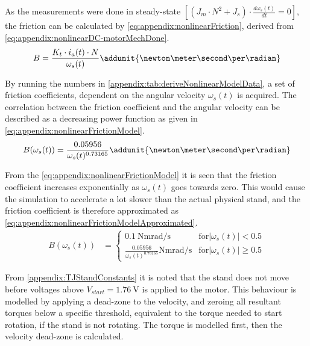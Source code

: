 As the measurements were done in steady-state $\left[ \left( J_m\cdot N^2 + J_s\right)\cdot \frac{d \omega_s(t)}{d t} = 0 \right]$, the friction can be calculated by \autoref{eq:appendix:nonlinearFriction}, derived from \autoref{eq:appendix:nonlinearDC-motorMechDone}.
\begin{equation}
B =\frac{K_t\cdot i_a(t)\cdot N}{\omega_s (t)} \addunit{\newton\meter\second\per\radian}\label{eq:appendix:nonlinearFriction}
\end{equation}

By running the numbers in \autoref{appendix:tab:deriveNonlinearModelData}, a set of friction coefficients, dependent on the angular velocity $\omega_s(t)$ is acquired. The correlation between the friction coefficient and the angular velocity can be described as a decreasing power function as given in \autoref{eq:appendix:nonlinearFrictionModel}.
\begin{equation}
B(\omega_s(t))=\frac{0.05956}{\omega_s(t)^{0.73165}} \addunit{\newton\meter\second\per\radian} \label{eq:appendix:nonlinearFrictionModel}
\end{equation}
\startexplain
{}
\stopexplain

From the \autoref{eq:appendix:nonlinearFrictionModel} it is seen that the friction coefficient increases exponentially as $\omega_s(t)$ goes towards zero. This would cause the simulation to accelerate a lot slower than the actual physical stand, and the friction coefficient is therefore approximated as \autoref{eq:appendix:nonlinearFrictionModelApproximated}.
\begin{align} \label{eq:appendix:nonlinearFrictionModelApproximated}
 B(\omega_s(t)) &=
  \begin{cases}
	\SI{0.1}{\newton\meter\radian\per\second}   															& \text{for} \left|\omega_s(t)\right| < 0.5 \\
	\frac{0.05956}{\omega_s(t)^{0.73165}} \si{\newton\meter\radian\per\second}		& \text{for} \left|\omega_s(t)\right| \geq 0.5
  \end{cases}
\end{align}

From \autoref{appendix:TJStandConstants} it is noted that the stand does not move before voltages above $V_{start} = \SI{1.76}{\volt}$ is applied to the motor. This behaviour is modelled by applying a dead-zone to the velocity, and zeroing all resultant torques below a specific threshold, equivalent to the torque needed to start rotation, if the stand is not rotating. The torque is modelled first, then the velocity dead-zone is calculated.

